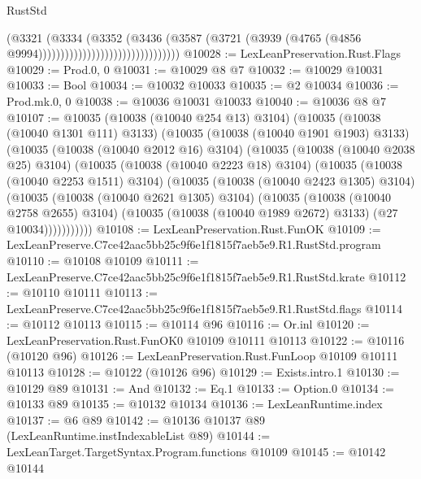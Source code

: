 \begin{lexlean}{RustStd}
\begin{coremodule}
                                                  (@3321
                                                    (@3334
                                                      (@3352
                                                        (@3436
                                                          (@3587
                                                            (@3721
                                                              (@3939
                                                                (@4765
                                                                  (@4856
                                                                    @9994))))))))))))))))))))))))))))))))
@10028 := LexLeanPreservation.Rust.Flags
@10029 := Prod.{0, 0}
@10031 := @10029 @8 @7
@10032 := @10029 @10031
@10033 := Bool
@10034 := @10032 @10033
@10035 := @2 @10034
@10036 := Prod.mk.{0, 0}
@10038 := @10036 @10031 @10033
@10040 := @10036 @8 @7
@10107 := @10035
    (@10038 (@10040 @254 @13) @3104)
    (@10035
      (@10038 (@10040 @1301 @111) @3133)
      (@10035
        (@10038 (@10040 @1901 @1903) @3133)
        (@10035
          (@10038 (@10040 @2012 @16) @3104)
          (@10035
            (@10038 (@10040 @2038 @25) @3104)
            (@10035
              (@10038 (@10040 @2223 @18) @3104)
              (@10035
                (@10038 (@10040 @2253 @1511) @3104)
                (@10035
                  (@10038 (@10040 @2423 @1305) @3104)
                  (@10035
                    (@10038 (@10040 @2621 @1305) @3104)
                    (@10035
                      (@10038 (@10040 @2758 @2655) @3104)
                      (@10035 (@10038 (@10040 @1989 @2672) @3133) (@27 @10034)))))))))))
@10108 := LexLeanPreservation.Rust.FunOK
@10109 := LexLeanPreserve.C7ce42aac5bb25c9f6e1f1815f7aeb5e9.R1.RustStd.program
@10110 := @10108 @10109
@10111 := LexLeanPreserve.C7ce42aac5bb25c9f6e1f1815f7aeb5e9.R1.RustStd.krate
@10112 := @10110 @10111
@10113 := LexLeanPreserve.C7ce42aac5bb25c9f6e1f1815f7aeb5e9.R1.RustStd.flags
@10114 := @10112 @10113
@10115 := @10114 @96
@10116 := Or.inl
@10120 := LexLeanPreservation.Rust.FunOK0 @10109 @10111 @10113
@10122 := @10116 (@10120 @96)
@10126 := LexLeanPreservation.Rust.FunLoop @10109 @10111 @10113
@10128 := @10122 (@10126 @96)
@10129 := Exists.intro.{1}
@10130 := @10129 @89
@10131 := And
@10132 := Eq.{1}
@10133 := Option.{0}
@10134 := @10133 @89
@10135 := @10132 @10134
@10136 := LexLeanRuntime.index
@10137 := @6 @89
@10142 := @10136 @10137 @89 (LexLeanRuntime.instIndexableList @89)
@10144 := LexLeanTarget.TargetSyntax.Program.functions @10109
@10145 := @10142 @10144

\end{coremodule}
\end{lexlean}
